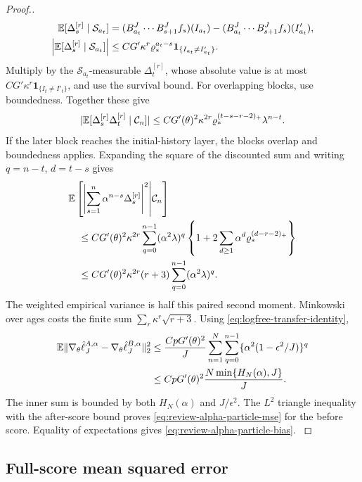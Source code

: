 \documentclass[11pt]{article}
\theoremstyle{thmstylethree}%
\begin{document}
\begin{proof}[Proof.]
{\begin{align*}
\mathbb{E}[\Delta_s^{[r]}\mid\mathcal S_{a_t}]
&=(B_{a_t}^J\cdots B_{s+1}^Jf_s)(I_{a_t})
 -(B_{a_t}^J\cdots B_{s+1}^Jf_s)(I'_{a_t}),\\
\left|\mathbb{E}[\Delta_s^{[r]}\mid\mathcal S_{a_t}]\right|
&\leq CG'\kappa^r\varrho_*^{a_t-s}
                         \mathbf1_{\{I_{a_t}\ne I'_{a_t}\}}.
\end{align*}
Multiply by the $\mathcal S_{a_t}$-measurable $\Delta_t^{[r]}$, whose
absolute value is at most $CG'\kappa^r\mathbf1_{\{I_t\ne I'_t\}}$,
and use the survival bound. For overlapping blocks, use boundedness.
Together these give
\begin{equation}
|\mathbb{E}[\Delta_s^{[r]}\Delta_t^{[r]}\mid\mathcal C_n]|
\leq CG'(\theta)^2\kappa^{2r}
 \varrho_*^{(t-s-r-2)_+}\lambda^{n-t}.
\end{equation}
If the later block reaches the initial-history layer, the blocks overlap
and boundedness applies.
Expanding the square of the discounted sum and writing $q=n-t$,
$d=t-s$ gives
\begin{align}
&\mathbb{E}\left[\left|\sum_{s=1}^n\alpha^{n-s}\Delta_s^{[r]}\right|^2
       \middle|\mathcal C_n\right]\notag\\
&\quad\leq CG'(\theta)^2\kappa^{2r}
 \sum_{q=0}^{n-1}(\alpha^2\lambda)^q
 \left\{1+2\sum_{d\geq1}\alpha^d
                  \varrho_*^{(d-r-2)_+}\right\}\notag\\
&\quad\leq CG'(\theta)^2\kappa^{2r}(r+3)
                    \sum_{q=0}^{n-1}(\alpha^2\lambda)^q.
\end{align}
The weighted empirical variance is half this paired second moment.
Minkowski over ages costs the finite sum
$\sum_r\kappa^r\sqrt{r+3}$. Using \eqref{eq:logfree-transfer-identity},
\begin{align}
\mathbb{E}\|\nabla_\theta\hat\ell_J^{A,\alpha}
      -\nabla_\theta\hat\ell_J^{B,\alpha}\|_2^2
&\leq\frac{CpG'(\theta)^2}{J}
   \sum_{n=1}^N\sum_{q=0}^{n-1}
       \{\alpha^2(1-\epsilon^2/J)\}^q\notag\\
&\leq CpG'(\theta)^2\frac{N\min\{H_N(\alpha),J\}}{J}.
\label{eq:logfree-transfer}
\end{align}
The inner sum is bounded by both $H_N(\alpha)$ and $J/\epsilon^2$.
The $L^2$ triangle inequality with the after-score bound proves
\eqref{eq:review-alpha-particle-mse} for the before score. Equality of
expectations gives \eqref{eq:review-alpha-particle-bias}.
\endgraf
}


\end{proof}

\subsection{Full-score mean squared error}
\end{document}
